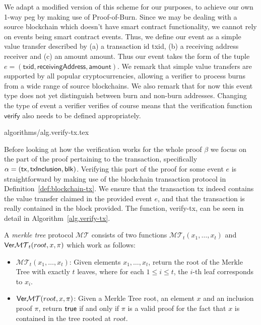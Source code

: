 We adapt a modified version of this scheme for our purposes, to achieve our own 1-way peg by making use of Proof-of-Burn. Since we may be dealing with a source blockchain which doesn't have smart contract functionality, we cannot rely on events being smart contract events. Thus, we define our event as a simple value transfer described by (a) a transaction id \textsf{txid}, (b) a receiving address \textsf{receiver} and (c) an amount \textsf{amount}. Thus our event takes the form of the tuple $e = (\textsf{txid}, \textsf{receivingAddress}, \textsf{amount})$. We remark that simple value transfers are supported by all popular cryptocurrencies, allowing a verifier to process burns from a wide range of source blockchains. We also remark that for now this event type does not yet distinguish between burn and non-burn addresses. Changing the type of event a verifier verifies of course means that the verification function $\textsf{verify}$ also needs to be defined appropriately.

{algorithms/alg.verify-tx.tex}

Before looking at how the verification works for the whole proof $\beta$ we focus on the part of the proof pertaining to the transaction, specifically $\alpha = \sf(tx, txInclusion, blk)$. Verifying this part of the proof for some event $e$ is straightforward by making use of the blockchain transaction protocol in Definition~\ref{def:blockchain-tx}. We ensure that the transaction \textsf{tx} indeed contains the value transfer claimed in the provided event $e$, and that the transaction is really contained in the block provided. The function, \textsf{verify-tx}, can be seen in detail in Algorithm~\ref{alg.verify-tx}.

\begin{definition}
  A \emph{merkle tree} protocol $\mathcal{MT}$ consists of two functions $\mathcal{MT}_t(x_1, \dots, x_t)$ and $\mathsf{Ver}\mathcal{MT}_t(root, x, \pi)$ which work as follows:

  \begin{itemize}
    \item $\mathcal{MT}_t(x_1, \dots, x_t)$: Given elements $x_1, \dots, x_t$, return the root of the Merkle Tree with exactly $t$ leaves, where for each $1 \le i \le t$, the $i$-th leaf corresponds to $x_i$.

    \item $\mathsf{Ver}\mathcal{MT}(root, x, \pi)$: Given a Merkle Tree root, an element $x$ and an inclusion proof $\pi$, return $\sf{true}$ if and only if $\pi$ is a valid proof for the fact that $x$ is contained in the tree rooted at $root$.
  \end{itemize}
\end{definition}

